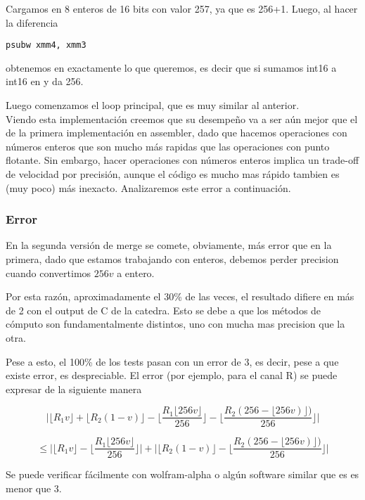 Cargamos en  8 enteros de 16 bits con valor 257, ya que es 256+1.
Luego, al hacer la diferencia

\begin{lstlisting}
psubw xmm4, xmm3
\end{lstlisting}

obtenemos en  exactamente lo que queremos, es decir que si sumamos int16 a int16 en  y  da 256.


Luego comenzamos el loop principal, que es muy similar al anterior.
\\

Viendo esta implementación creemos que su desempeño va a ser aún mejor que el de la primera implementación en assembler, dado que hacemos operaciones con números enteros que son mucho más rapidas que las operaciones con punto flotante. Sin embargo, hacer operaciones con números enteros implica un trade-off de velocidad por precisión, aunque el código es mucho mas rápido tambien es (muy poco) más inexacto. Analizaremos este error a continuación.

\subsubsection*{Error}

En la segunda versión de merge se comete, obviamente, más error que en la primera, dado que estamos trabajando con enteros, debemos perder precision cuando convertimos $256v$ a entero.

Por esta razón, aproximadamente el 30\% de las veces, el resultado difiere en más de 2 con el output de C de la catedra. Esto se debe a que los métodos de cómputo son fundamentalmente distintos, uno con mucha mas precision que la otra.

Pese a esto, el 100\% de los tests pasan con un error de 3, es decir, pese a que existe error, es despreciable. El error (por ejemplo, para el canal R) se puede expresar de la siguiente manera

$$\bigg|\lfloor R_1v\rfloor + \lfloor R_2(1-v) \rfloor
  -\bigg\lfloor \frac{R_1\lfloor 256v \rfloor}{256} \bigg\rfloor 
 -\bigg\lfloor \frac{R_2(256- \lfloor 256v) \rfloor)}{256} \bigg\rfloor\bigg| $$


$$\leq
\bigg|
\lfloor R_1v\rfloor - \bigg\lfloor \frac{R_1\lfloor 256v \rfloor}{256} \bigg\rfloor
\bigg|
+
\bigg|
\lfloor R_2(1-v) \rfloor -\bigg\lfloor \frac{R_2(256- \lfloor 256v) \rfloor)}{256} \bigg\rfloor
\bigg| $$

Se puede verificar fácilmente con wolfram-alpha o algún software similar que es es menor que 3.

